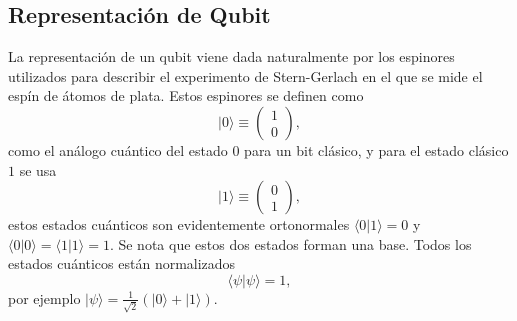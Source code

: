 \documentclass[a4paper]{article}
\begin{document}
\subsection{Representación de Qubit}
La representación de un qubit viene dada naturalmente por los espinores utilizados para describir el experimento de Stern-Gerlach en el que se mide el espín de átomos de plata. Estos espinores se definen como 
\begin{equation}\label{eq::qubit0}
|0\rangle\equiv
\begin{pmatrix}
		1\\
		0
	\end{pmatrix},
\end{equation}
como el análogo cuántico del estado $0$ para un bit clásico, y para el estado clásico $1$ se usa
\begin{equation}\label{eq::qubit1}
|1\rangle\equiv
\begin{pmatrix}
		0\\
		1
	\end{pmatrix},
\end{equation}
estos estados cuánticos son evidentemente ortonormales $\langle 0 | 1\rangle=0$ y $\langle 0 | 0\rangle=\langle 1 | 1\rangle=1$. Se nota que estos dos estados forman una base. Todos los estados cuánticos están normalizados
\begin{equation}
\langle \psi | \psi\rangle=1,
\end{equation}
por ejemplo $|\psi\rangle=\frac{1}{\sqrt{2}}(|0\rangle+|1\rangle)$.
\end{document}
